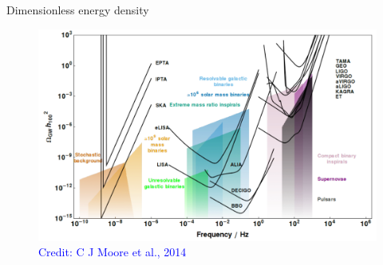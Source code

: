 \documentclass[pdf]{beamer}
\newcommand{\credit}[1]{\tiny{\textcolor{blue}{Credit: #1}}}
\begin{document}
\begin{frame}{Dimensionless energy density}
\begin{figure}
\includegraphics[scale=.2]{fig/Energy-TOT.png}
\caption*{\credit{C J Moore et al., 2014}}
\end{figure}
\end{frame}
\end{document}
